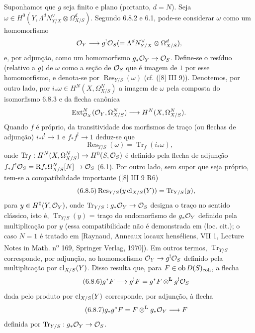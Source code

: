 Suponhamos que $g$ seja finito e plano (portanto, $d=N$). Seja $\omega\in H^0(Y,\Lambda^d N_{Y/X}^{\vee}\otimes\Omega^d_{X/S})$. Segundo 6.8.2 e 6.1, pode-se considerar $\omega$ como um homomorfismo
\[
\mathcal{O}_Y\longrightarrow g^!\mathcal{O}_S(=\Lambda^d N_{Y/X}^{\vee}\otimes\Omega^d_{X/S}),
\]
e, por adjunção, como um homomorfismo $g_*\mathcal{O}_Y\to\mathcal{O}_S$. Define-se o resíduo (relativo a $g$) de $\omega$ como a seção de $\mathcal{O}_S$ que é imagem de $1$ por esse homomorfismo, e denota-se por $\operatorname{Res}_{Y/S}(\omega)$ (cf. ([8] III 9)). Denotemos, por outro lado, por $i_*\omega\in H^N(X,\Omega^N_{X/S})$ a imagem de $\omega$ pela composta do isomorfismo 6.8.3 e da flecha canônica
\[
\operatorname{Ext}^N_{\mathcal{O}_X}(\mathcal{O}_Y,\Omega^N_{X/S})\longrightarrow H^N(X,\Omega^N_{X/S}).
\]
Quando $f$ é próprio, da transitividade dos morfismos de traço (ou flechas de adjunção) $i_*i^!\to 1$ e $f_*f^!\to 1$ deduz-se que
\begin{equation}
\tag{6.8.4}
\operatorname{Res}_{Y/S}(\omega)=\operatorname{Tr}_f(i_*\omega),
\end{equation}
onde $\operatorname{Tr}_f:H^N(X,\Omega^N_{X/S})\to H^0(S,\mathcal{O}_S)$ é definido pela flecha de adjunção $f_*f^!\mathcal{O}_S=\mathrm{R} f_*\Omega^N_{X/S}[N]\to\mathcal{O}_S$ (6.1). Por outro lado, sem supor que seja próprio, tem-se a compatibilidade importante ([8] III 9 R6)
\begin{equation}
\tag{6.8.5}
\operatorname{Res}_{Y/S}(y\operatorname{cl}_{X/S}(Y))=\operatorname{Tr}_{Y/S}(y),
\end{equation}
para $y\in H^0(Y,\mathcal{O}_Y)$, onde $\operatorname{Tr}_{Y/S}:g_*\mathcal{O}_Y\to\mathcal{O}_S$ designa o traço no sentido clássico, isto é, $\operatorname{Tr}_{Y/S}(y)$ = traço do endomorfismo de $g_*\mathcal{O}_Y$ definido pela multiplicação por $y$ (essa compatibilidade não é demonstrada em (loc. cit.); o caso $N=1$ é tratado em [Raynaud, Anneaux locaux henséliens, VII 1, Lecture Notes in Math. n\textsuperscript{o} 169, Springer Verlag, 1970]). Em outros termos, $\operatorname{Tr}_{Y/S}$ corresponde, por adjunção, ao homomorfismo $\mathcal{O}_Y\to g^!\mathcal{O}_S$ definido pela multiplicação por $\operatorname{cl}_{X/S}(Y)$. Disso resulta que, para $F\in\operatorname{ob} D(S)_{\mathrm{coh}}$, a flecha
\begin{equation}
\tag{6.8.6}
g^*F\longrightarrow g^!F=g^*F\otimes^{\mathbf L}g^!\mathcal{O}_S
\end{equation}
dada pelo produto por $\operatorname{cl}_{X/S}(Y)$ corresponde, por adjunção, à flecha
\begin{equation}
\tag{6.8.7}
g_*g^*F=F\otimes^{\mathbf L}g_*\mathcal{O}_Y\longrightarrow F
\end{equation}
definida por $\operatorname{Tr}_{Y/S}:g_*\mathcal{O}_Y\to\mathcal{O}_S$.
